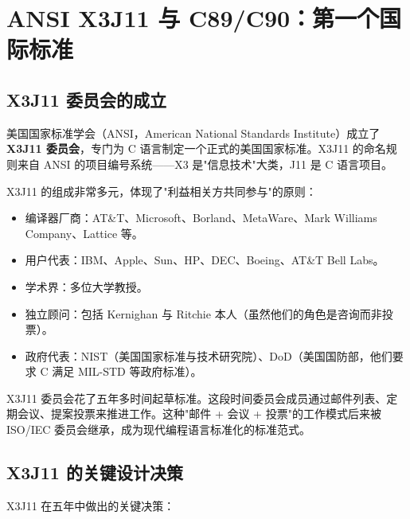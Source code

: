 \documentclass[12pt,a4paper,fontset=fandol]{ctexbook}
\newcommand{\yearlabel}[1]{%
  \tcbox[on line,colback=yearheadbg,colframe=yearheadbg,
    boxrule=0pt,arc=1pt,left=3pt,right=3pt,top=1pt,bottom=1pt,
    colupper=white,fontupper=\scriptsize\bfseries]{#1}}
\newcommand{\yrlbl}[1]{\yearlabel{#1}}
\begin{document}
\chapter{ANSI X3J11 与 C89/C90：第一个国际标准}

\section{X3J11 委员会的成立}

\yrlbl{1983} 美国国家标准学会（ANSI，American National Standards Institute）成立了 \textbf{X3J11 委员会}，专门为 C 语言制定一个正式的美国国家标准。X3J11 的命名规则来自 ANSI 的项目编号系统——X3 是"信息技术"大类，J11 是 C 语言项目。

X3J11 的组成非常多元，体现了"利益相关方共同参与"的原则：

\begin{itemize}
  \item 编译器厂商：AT\&T、Microsoft、Borland、MetaWare、Mark Williams Company、Lattice 等。
  \item 用户代表：IBM、Apple、Sun、HP、DEC、Boeing、AT\&T Bell Labs。
  \item 学术界：多位大学教授。
  \item 独立顾问：包括 Kernighan 与 Ritchie 本人（虽然他们的角色是咨询而非投票）。
  \item 政府代表：NIST（美国国家标准与技术研究院）、DoD（美国国防部，他们要求 C 满足 MIL-STD 等政府标准）。
\end{itemize}

\yrlbl{1983-1988} X3J11 委员会花了五年多时间起草标准。这段时间委员会成员通过邮件列表、定期会议、提案投票来推进工作。这种"邮件 + 会议 + 投票"的工作模式后来被 ISO/IEC 委员会继承，成为现代编程语言标准化的标准范式。

\section{X3J11 的关键设计决策}

X3J11 在五年中做出的关键决策：
\end{document}
